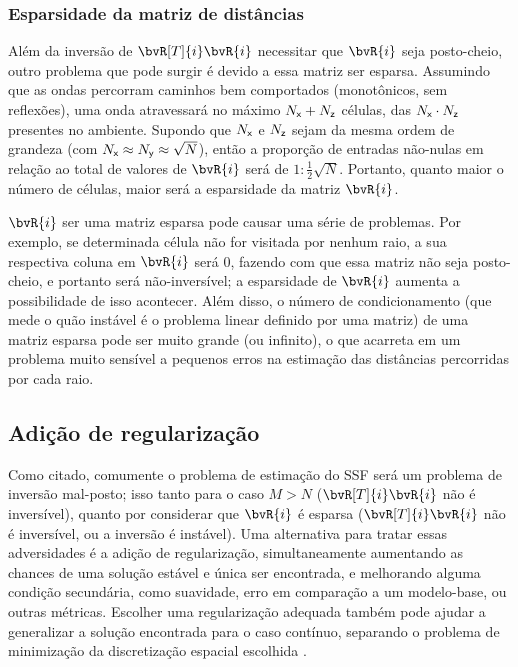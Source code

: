 \subsubsection*{Esparsidade da matriz de distâncias}
Além da inversão de $\bvR[T]{i} \bvR{i}$ necessitar que $\bvR{i}$ seja posto-cheio, outro problema que pode surgir é devido a essa matriz ser esparsa. Assumindo que as ondas percorram caminhos bem comportados (monotônicos, sem reflexões), uma onda atravessará no máximo $N_{{\textsf{x}}} + N_{{\textsf{z}}}$ células, das $N_{{\textsf{x}}}\cdot N_{{\textsf{z}}}$ presentes no ambiente. Supondo que $N_{{\textsf{x}}}$ e $N_{{\textsf{z}}}$ sejam da mesma ordem de grandeza (com $N_{{\textsf{x}}} \approx N_{{\textsf{y}}} \approx \sqrt{N}$), então a proporção de entradas não-nulas em relação ao total de valores de $\bvR{i}$ será de $1:\frac{1}{2}\sqrt{N}$. Portanto, quanto maior o número de células, maior será a esparsidade da matriz $\bvR{i}$.

$\bvR{i}$ ser uma matriz esparsa pode causar uma série de problemas. Por exemplo, se determinada célula não for visitada por nenhum raio, a sua respectiva coluna em $\bvR{i}$ será $0$, fazendo com que essa matriz não seja posto-cheio, e portanto será não-inversível; a esparsidade de $\bvR{i}$ aumenta a possibilidade de isso acontecer. Além disso, o número de condicionamento (que mede o quão instável é o problema linear definido por uma matriz) de uma matriz esparsa pode ser muito grande (ou infinito), o que acarreta em um problema muito sensível a pequenos erros na estimação das distâncias percorridas por cada raio.

\subsection{Adição de regularização}
\label{subsec:sec1:regularizacao}
Como citado, comumente o problema de estimação do SSF será um problema de inversão mal-posto; isso tanto para o caso $M > N$ ($\bvR[T]{i}\bvR{i}$ não é inversível), quanto por considerar que $\bvR{i}$ é esparsa ($\bvR[T]{i}\bvR{i}$ não é inversível, ou a inversão é instável). Uma alternativa para tratar essas adversidades é a adição de regularização, simultaneamente aumentando as chances de uma solução estável e única ser encontrada, e melhorando alguma condição secundária, como suavidade, erro em comparação a um modelo-base, ou outras métricas. Escolher uma regularização adequada também pode ajudar a generalizar a solução encontrada para o caso contínuo, separando o problema de minimização da discretização espacial escolhida \cite{zhang_nonlinear_1998,delprat-jannaud_illposed_1993}.


